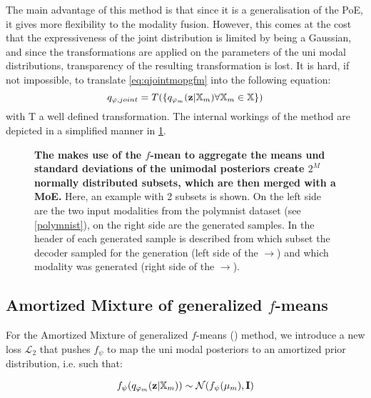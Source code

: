 \smallskip

The main advantage of this method is that since it is a generalisation of the PoE, it gives more flexibility to the modality fusion.
However, this comes at the cost that the expressiveness of the joint distribution is limited by being a Gaussian, and since the transformations are applied on the parameters of the uni modal distributions, transparency of the resulting transformation is lost.
It is hard, if not impossible, to translate \cref{eq:qjointmopgfm} into the following equation:
\begin{equation}
    q_{\varphi, joint} = T(\{q_{\varphi_m}(\textbf{z}|\mathbb{X}_m) \forall \mathbb{X}_m \in \mathbb{X}\})
\end{equation}
with T a well defined transformation.
The internal workings of the  method are depicted in a simplified manner in \cref{fig:mopgfm}.


\begin{figure}[h!]
    \centering
    \caption{\textbf{The  makes use of the $f$-mean to aggregate the means und standard deviations of the unimodal posteriors create $2^M$ normally distributed subsets, which are then merged with a MoE.} Here, an example with 2 subsets is shown. On the left side are the two input modalities from the polymnist dataset (see \cref{polymnist}), on the right side are the generated samples.
    In the header of each generated sample is described from which subset the decoder sampled for the generation (left side of the $\rightarrow$) and which modality was generated (right side of the $\rightarrow$).}
    \label{fig:mopgfm}
\end{figure}



\subsection{Amortized Mixture of generalized $f$-means}\label{subsubsec:mogfm_amortized}
For the Amortized Mixture of generalized $f$-means () method, we introduce a new loss $\mathcal{L}_2$ that pushes $f_{\psi}$ to map the uni modal posteriors to an amortized prior distribution, i.e. such that:

\begin{equation}
    \label{eq:amortizedprior}
    f_{\psi}(q_{\varphi_m}(\textbf{z}|\mathbb{X}_m)) \sim \mathcal{N}(f_{\psi}(\mu_m), \textbf{I})
\end{equation}

